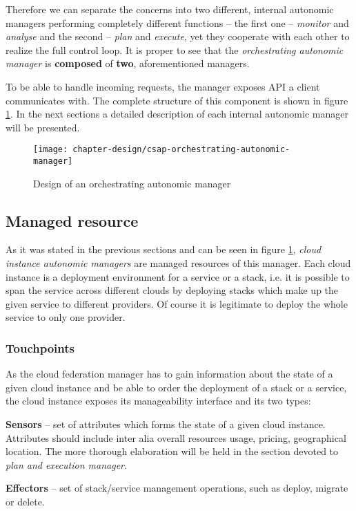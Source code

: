Therefore we can separate the concerns into two different, internal autonomic managers performing completely different functions -- the first one -- \emph{monitor} and \emph{analyse} and the second -- \emph{plan} and \emph{execute}, yet they cooperate with each other to realize the full control loop. It is proper to see that the \emph{orchestrating autonomic manager} is \textbf{composed} of \textbf{two}, aforementioned managers.

To be able to handle incoming requests, the manager exposes API a client communicates with. The complete structure of this component is shown in figure \ref{img:orchestrating-autonomic-manager}. In the next sections a detailed description of each internal autonomic manager will be presented.

\begin{figure}[!ht]
  \begin{center}
    \texttt{[image: chapter-design/csap-orchestrating-autonomic-manager]}
  \end{center}
  \caption{Design of an orchestrating autonomic manager}
  \label{img:orchestrating-autonomic-manager}
\end{figure}

\subsection{Managed resource}
As it was stated in the previous sections and can be seen in figure \ref{img:orchestrating-autonomic-manager}, \emph{cloud instance autonomic managers} are managed resources of this manager. Each cloud instance is a deployment environment for a service or a stack, i.e. it is possible to span the service across different clouds by deploying stacks which make up the given service to different providers. Of course it is legitimate to deploy the whole service to only one provider.
\subsubsection*{Touchpoints}
As the cloud federation manager has to gain information about the state of a given cloud instance and be able to order the deployment of a stack or a service, the cloud instance exposes its manageability interface and its two types:
\begin{asparaenum}
\item[\textbf{Sensors}] -- set of attributes which forms the state of a given cloud instance. Attributes should include inter alia overall resources usage, pricing, geographical location. The more thorough elaboration will be held in the section devoted to \emph{plan and execution manager}.
\item[\textbf{Effectors}] -- set of stack/service management operations, such as deploy, migrate or delete.
\end{asparaenum}

